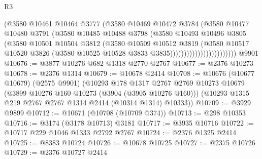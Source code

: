 \begin{lexlean}{R3}
\begin{coremodule}
                                  (@3580
                                    @10461
                                    @10464
                                    @3777
                                    (@3580
                                      @10469
                                      @10472
                                      @3784
                                      (@3580
                                        @10477
                                        @10480
                                        @3791
                                        (@3580
                                          @10485
                                          @10488
                                          @3798
                                          (@3580
                                            @10493
                                            @10496
                                            @3805
                                            (@3580
                                              @10501
                                              @10504
                                              @3812
                                              (@3580
                                                @10509
                                                @10512
                                                @3819
                                                (@3580
                                                  @10517
                                                  @10520
                                                  @3826
                                                  (@3580
                                                    @10525
                                                    @10528
                                                    @3833
                                                    @3835))))))))))))))))))))))))
    @9901
@10676 := @3877 @10276 @682 @1318 @2770 @2767
@10677 := @2376 @10273
@10678 := @2376 @1314
@10679 := @10678 @2414
@10708 := @10676
    (@10677 @10679)
    (@2575 @9901)
    (@10293
      @178
      @1317
      @2767
      @2769
      @10273
      @10679
      (@3899 @10276 @160 @10273 (@3904 (@3905 @10276 @160)))
      (@10293 @1315 @219 @2767 @2767 @1314 @2414 (@10314 @1314) @10333))
@10709 := @3929 @9899
@10712 := @10671 (@10708 (@10709 @374))
@10713 := @298 @10353
@10716 := @3174 (@3178 @10713) @3181
@10717 := @3935 @10716
@10722 := @10717 @229 @1046 @1333 @2792 @2767
@10724 := @2376 @1325 @2414
@10725 := @8383 @10724
@10726 := @10678 @10725
@10727 := @2375 @10726
@10729 := @2376 @10727 @2414

\end{coremodule}
\end{lexlean}
